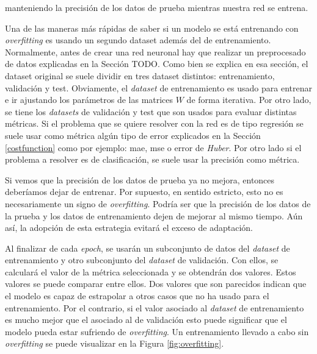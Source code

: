 manteniendo la precisión de los datos de prueba mientras nuestra red se entrena. 

Una de las maneras más rápidas de saber si un modelo se está entrenando con \textit{overfitting} es usando un segundo dataset además del de entrenamiento. Normalmente, antes de crear una red neuronal hay que realizar un preprocesado de datos explicadas en la Sección TODO. Como bien se explica en esa sección, el dataset original se suele dividir en tres dataset distintos: entrenamiento, validación y test. Obviamente, el \textit{dataset} de entrenamiento es usado para entrenar e ir ajustando los parámetros de las matrices $W$ de forma iterativa. Por otro lado, se tiene los \textit{datasets} de validación y test que son usados para evaluar distintas métricas. Si el problema que se quiere resolver con la red es de tipo regresión se suele usar como métrica algún tipo de error explicados en la Sección \ref{costfunction} como por ejemplo: \acrshort{mae}, \acrshort{mse} o error de \textit{Huber}. Por otro lado si el problema a resolver es de clasificación, se suele usar la precisión como métrica.
\newline

Si vemos que la precisión de los datos de prueba ya no mejora, entonces deberíamos dejar de entrenar. Por supuesto, en sentido estricto, esto no es necesariamente un signo de \textit{overfitting}. Podría ser que la precisión de los datos de la prueba y los datos de entrenamiento dejen de mejorar al mismo tiempo. Aún así, la adopción de esta estrategia evitará el exceso de adaptación.
\newline

Al finalizar de cada \textit{epoch}, se usarán un subconjunto de datos del \textit{dataset} de entrenamiento y otro subconjunto del \textit{dataset} de validación. Con ellos, se calculará el valor de la métrica seleccionada y se obtendrán dos valores. Estos valores se puede comparar entre ellos. Dos valores que son parecidos indican que el modelo es capaz de estrapolar a otros casos que no ha usado para el entrenamiento. Por el contrario, si el valor asociado al \textit{dataset} de entrenamiento es mucho mejor que el asociado al de validación esto puede significar que el modelo pueda estar sufriendo de \textit{overfitting}. Un entrenamiento llevado a cabo sin \textit{overfitting} se puede visualizar en la Figura \ref{fig:overfitting}.
\newline

